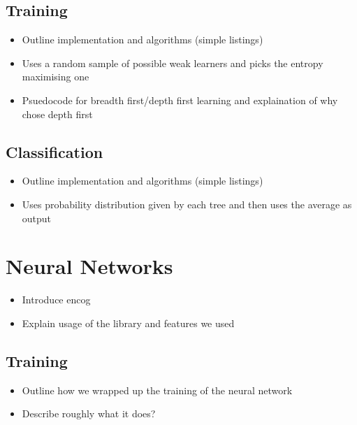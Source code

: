 \documentclass[12pt,twoside,notitlepage]{report}
\begin{document}
      \subsection{Training}
          \begin{framed}
              \begin{itemize}
                  \item Outline implementation and algorithms (simple listings)
                  \item Uses a random sample of possible weak learners and picks the entropy maximising one
                  \item Psuedocode for breadth first/depth first learning and explaination of why chose depth first
              \end{itemize}
          \end{framed}

      \subsection{Classification}
          \begin{framed}
              \begin{itemize}
                  \item Outline implementation and algorithms (simple listings)
                  \item Uses probability distribution given by each tree and then uses the average as output
              \end{itemize}
          \end{framed}

    \section{Neural Networks}
        \begin{framed}
            \begin{itemize}
                \item Introduce encog
                \item Explain usage of the library and features we used
            \end{itemize}
        \end{framed}

        \subsection{Training}
            \begin{framed}
                \begin{itemize}
                    \item Outline how we wrapped up the training of the neural network
                    \item Describe roughly what it does?
                \end{itemize}
            \end{framed}
\end{document}
